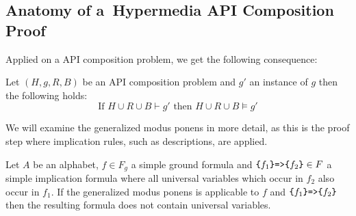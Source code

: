 \subsection{Anatomy of a~Hypermedia API Composition Proof}
\label{sec:ProofAnatomy} 

Applied on a API composition problem, we get the following consequence:
\begin{corollary}
Let $(H,g,R,B)$ be an API composition problem and $g'$ an instance  of $g$ then the following holds:
\[\text{If }H\cup R \cup B \vdash g' \text{ then }H\cup R \cup B \models g'\]
\end{corollary}



%  
 


We will examine the generalized modus ponens in more detail,
as this is the proof step where implication rules, 
such as \restdesc descriptions, are applied.

\label{sec:Reasoning}
\begin{lemma}\label{lemma:Reasoning}
Let $A$ be an \nthree alphabet, %
$f\in F_g$ a simple ground formula and $\verb!{!f_1\verb!}=>{!f_2\verb!}!\in F$ a simple implication formula %
where all 
universal variables which occur in $f_2$ %
also occur in $f_1$. If the generalized modus ponens is applicable to $f$ and $\verb!{!f_1\verb!}=>{!f_2\verb!}!$ then
the resulting formula does not contain universal variables.
\end{lemma}

